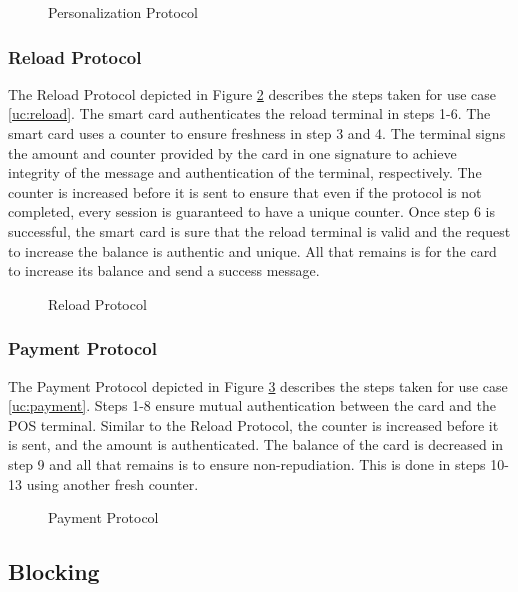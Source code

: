  \begin{figure}[h!]
     \centering
     
     \caption{Personalization Protocol}
     \label{fig:PersonProtocol}
 \end{figure}

\subsubsection{Reload Protocol}
The Reload Protocol depicted in Figure \ref{fig:ReloadProtocol} describes the steps taken for use case \ref{uc:reload}.
The smart card authenticates the reload terminal in steps 1-6.
The smart card uses a counter to ensure freshness in step 3 and 4.
The terminal signs the amount and counter provided by the card in one signature to achieve integrity of the message and authentication of the terminal, respectively.
The counter is increased before it is sent to ensure that even if the protocol is not completed, every session is guaranteed to have a unique counter.
Once step 6 is successful, the smart card is sure that the reload terminal is valid and the request to increase the balance is authentic and unique.
All that remains is for the card to increase its balance and send a success message.
 \begin{figure}[h!]
     \centering
     
     \caption{Reload Protocol}
     \label{fig:ReloadProtocol}
 \end{figure}

\subsubsection{Payment Protocol}
The Payment Protocol depicted in Figure \ref{fig:POSProtocol} describes the steps taken for use case \ref{uc:payment}.
Steps 1-8 ensure mutual authentication between the card and the POS terminal.
Similar to the Reload Protocol, the counter is increased before it is sent, and the amount is authenticated.
The balance of the card is decreased in step 9 and all that remains is to ensure non-repudiation.
This is done in steps 10-13 using another fresh counter.
\begin{figure}[h!]
    \centering
    
    \caption{Payment Protocol}
    \label{fig:POSProtocol}
\end{figure}


\subsection{Blocking}
